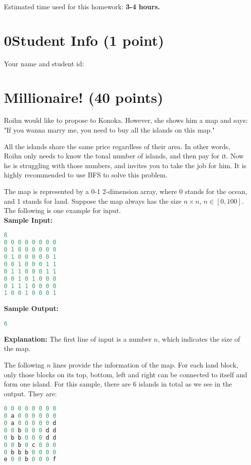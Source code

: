 \documentclass[11pt]{exam}
\begin{document}
Estimated time used for this homework: \textbf{3-4 hours.}

\newpage
\section*{0\quad Student Info (1 point)}
Your name and student id:
\begin{solution}
\end{solution}

\section{Millionaire! (40 points)}

Roihn would like to propose to Konoka. However, she shows him a map and says: "If you wanna marry me, you need to buy all the islands on this map." 

All the islands share the same price regardless of their area. In other words, Roihn only needs to know the tonal number of islands, and then pay for it. Now he is struggling with those numbers, and invites you to take the job for him. It is highly recommended to use BFS to solve this problem. 

The map is represented by a 0-1 2-dimension array, where 0 stands for the ocean, and 1 stands for land. Suppose the map always has the size $n\times n$, $n\in [0, 100]$. The following is one example for input.\\

\textbf{Sample Input:}
\begin{lstlisting}[language=c++]
8
0 0 0 0 0 0 0 0
0 1 0 0 0 0 0 0
0 1 0 0 0 0 0 1
0 0 1 0 0 0 1 1
0 1 1 0 0 0 1 1
0 0 1 0 1 0 0 0
0 1 1 1 0 0 0 0
1 0 0 1 0 0 0 1
\end{lstlisting}

\vspace{10pt}

\textbf{Sample Output:}
\begin{lstlisting}[language=c++]
6
\end{lstlisting}

\vspace{10pt}

\textbf{Explanation:}
The first line of input is a number $n$, which indicates the size of the map.

The following $n$ lines provide the information of the map. For each land block, only those blocks on its top, bottom, left and right can be connected to itself and form one island. For this sample, there are $6$ islands in total as we see in the output. They are:
\begin{lstlisting}[language=c++]
0 0 0 0 0 0 0 0
0 a 0 0 0 0 0 0
0 a 0 0 0 0 0 d
0 0 b 0 0 0 d d
0 b b 0 0 0 d d
0 0 b 0 c 0 0 0
0 b b b 0 0 0 0
e 0 0 b 0 0 0 f
\end{lstlisting}
\end{document}
